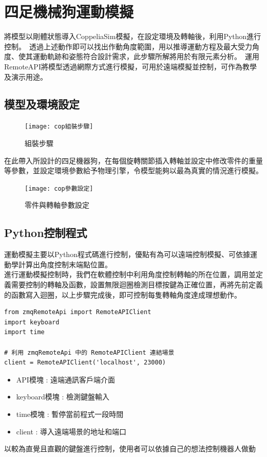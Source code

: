 \chapter{四足機械狗運動模擬}
將模型以剛體狀態導入CoppeliaSim模擬，在設定環境及轉軸後，利用Python進行控制。\
透過上述動作即可以找出作動角度範圍，用以推導運動方程及最大受力角度、使其運動軌跡和姿態符合設計需求，此步驟所解將用於有限元素分析。\
運用RemoteAPI將模型透過網際方式進行模擬，可用於遠端模擬並控制，可作為教學及演示用途。\\

\section{模型及環境設定}
\begin{figure}[hbt!]
\center
\texttt{[image: cop組裝步驟]}
\caption{組裝步驟}\label{cop組裝步驟}
\end{figure}
\newpage
在此帶入所設計的四足機器狗，在每個旋轉關節插入轉軸並設定中修改零件的重量等參數，並設定環境參數給予物理引擎，令模型能夠以最為真實的情況進行模擬。\\

\begin{figure}[hbt!]
\center
\texttt{[image: cop參數設定]}
\caption{零件與轉軸參數設定}\label{cop參數設定}
\end{figure}
\newpage

\section{Python控制程式}
運動模擬主要以Python程式碼進行控制，優點有為可以遠端控制模擬、可依據運動學計算出角度控制末端點位置。\\

進行運動模擬控制時，我們在軟體控制中利用角度控制轉軸的所在位置，調用並定義需要控制的轉軸及函數，設置無限迴圈檢測目標按鍵為正確位置，再將先前定義的函數寫入迴圈，以上步驟完成後，即可控制每隻轉軸角度達成理想動作。\\


\label{模塊導入}
\begin{lstlisting}[caption=\Large 模塊導入]
from zmqRemoteApi import RemoteAPIClient 
import keyboard
import time

# 利用 zmqRemoteApi 中的 RemoteAPIClient 連結場景
client = RemoteAPIClient('localhost', 23000)
\end{lstlisting}

\begin{itemize}
\item API模塊 : 遠端通訊客戶端介面
\item keyboard模塊 : 檢測鍵盤輸入
\item time模塊 : 暫停當前程式一段時間
\item client : 導入遠端場景的地址和端口
\end{itemize}
以較為直覺且直觀的鍵盤進行控制，使用者可以依據自己的想法控制機器人做動\\

